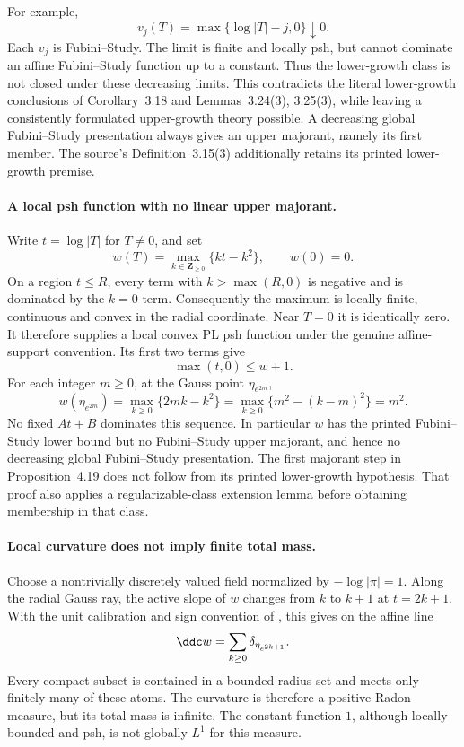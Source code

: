 For example,
\[
 v_j(T)=\max\{\log|T|-j,0\}\downarrow0.
\]
Each \(v_j\) is Fubini--Study. The limit is finite and locally psh,
but cannot dominate an affine Fubini--Study function up to a constant.
Thus the lower-growth class is not closed under these decreasing
limits. This contradicts the literal lower-growth conclusions of
Corollary~3.18 and Lemmas~3.24(3), 3.25(3), while leaving a consistently
formulated upper-growth theory possible. A decreasing global
Fubini--Study presentation always gives an upper majorant, namely its
first member. The source's Definition~3.15(3) additionally retains
its printed lower-growth premise.

\paragraph{A local psh function with no linear upper majorant.}
Write \(t=\log|T|\) for \(T\ne0\), and set
\[
 w(T)=\max_{k\in\mathbf Z_{\geq0}}\{kt-k^2\},\qquad w(0)=0.
\]
On a region \(t\leq R\), every term with \(k>\max(R,0)\) is negative
and is dominated by the \(k=0\) term. Consequently the maximum is
locally finite, continuous and convex in the radial coordinate. Near
\(T=0\) it is identically zero. It therefore supplies a local convex
PL psh function under the genuine affine-support convention.
Its first two terms give
\[
 \max(t,0)\leq w+1.
\]
For each integer \(m\geq0\), at the Gauss point \(\eta_{e^{2m}}\),
\[
 w(\eta_{e^{2m}})
 =\max_{k\geq0}\{2mk-k^2\}
 =\max_{k\geq0}\{m^2-(k-m)^2\}
 =m^2.
\]
No fixed \(At+B\) dominates this sequence. In particular \(w\)
has the printed Fubini--Study lower bound but no Fubini--Study upper
majorant, and hence no decreasing global Fubini--Study presentation.
The first majorant step in Proposition~4.19 does not follow from its
printed lower-growth hypothesis. That proof also applies a
regularizable-class extension lemma before obtaining membership in
that class.

\paragraph{Local curvature does not imply finite total mass.}
Choose a nontrivially discretely valued field normalized by
\(-\log|\pi|=1\). Along the radial Gauss ray, the active slope of \(w\)
changes from \(k\) to \(k+1\) at \(t=2k+1\).
With the unit calibration and sign convention of
, this gives on the affine line
\[
 \ddc w=\sum_{k\geq0}\delta_{\eta_{e^{2k+1}}}.
\]
Every compact subset is contained in a bounded-radius set and meets
only finitely many of these atoms. The curvature is therefore a
positive Radon measure, but its total mass is infinite. The constant
function \(1\), although locally bounded and psh, is not globally
\(L^1\) for this measure.

